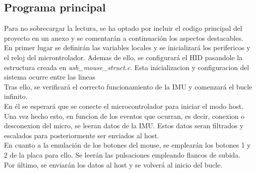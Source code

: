 \documentclass[a4paper,twoside]{article}
\begin{document}
\subsection{Programa principal}
Para no sobrecargar la lectura, se ha optado por incluir el codigo principal del proyecto en un anexo y se comentarán a continuación los aspectos destacables.\\
En primer lugar se definirán las variables locales y se inicializará los perifericos y el reloj del microntrolador. Ademas de ello, se configurará el HID pasandole la estructura creada en \textit{usb\_mouse\_struct.c}. Esta inicializacion y configuracion del sistema ocurre entre las lineas  \\
Tras ello, se verificará el correcto funcionamiento de la IMU y comenzará el bucle infinito.\\
En él se esperará que se conecte el microcontrolador para iniciar el modo host. Una vez hecho esto, en funcion de los eventos que ocurran, es decir, conexion o desconexion del micro, se leeran datos de la IMU. Estos datos seran filtrados y escalados para posteriormente ser enviados al host. \\
En cuanto a la emulación de los botones del mouse, se emplearán los botones 1 y 2 de la placa para ello. Se leerán las pulsaciones empleando flancos de subida. \\
Por último, se enviarán los datos al host y se volverá al inicio del bucle.

\newpage
\end{document}
